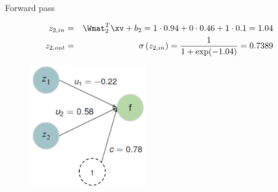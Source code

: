 \begin{vbframe}{ Forward pass}
  \begin{figure}
    \centering
  \end{figure}
\vspace*{-0.5cm}
  \begin{footnotesize}
    \begin{eqnarray*}
    z_{2,in} &=& \Wmat_2^T \xv + b_2 = 1 \cdot 0.94 + 0 \cdot 0.46 + 1 \cdot 0.1 = 1.04 \\
    z_{2,out} &=& \sigma\left(z_{2,in}\right) = \frac{1}{1+\exp(-1.04)} = \num[round-mode=places,round-precision=4]{0.73885}
    \end{eqnarray*}
  \end{footnotesize}
\framebreak

  \begin{figure}
    \centering
      \includegraphics[width=5cm]{figure/forwardprop4b_new.png}
  \end{figure}


\end{vbframe}
